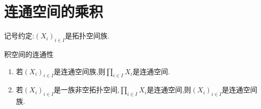 \section{连通空间的乘积}

记号约定:$\left(X_{i}\right)_{i\in I}$是拓扑空间族.

\begin{proposition}{积空间的连通性}{}
	\begin{enumerate}
		\item 若$\left(X_{i}\right)_{i\in I}$是连通空间族,则$\prod\limits_{i\in I}X_{i}$是连通空间.
		\item 若$\left(X_{i}\right)_{i\in I}$是一族非空拓扑空间,$\prod\limits_{i\in I}X_{i}$是连通空间,则$\left(X_{i}\right)_{i\in I}$是连通空间族.
	\end{enumerate}
\end{proposition}